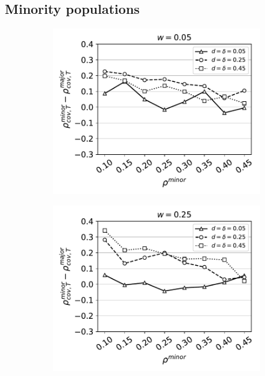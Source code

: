 \documentclass[11pt,letterpaper]{article}
\begin{document}
\subsection{Minority populations}

\begin{figure}[H]
  \centering
  \begin{subfigure}{0.31\textwidth}
    \includegraphics[width=\textwidth]{Figures/minority-homophily=0p05.pdf}
    \caption{}
  \end{subfigure}
  \begin{subfigure}{0.31\textwidth}
    \includegraphics[width=\textwidth]{Figures/minority-homophily=0p25.pdf}

\end{subfigure}
\end{figure}
\end{document}
